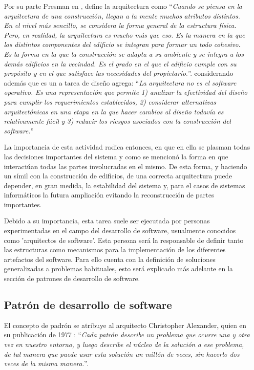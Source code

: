         Por su parte Presman en \cite{Pressman2010}, define la arquitectura como ``\textit{Cuando se piensa en la arquitectura de una construcción, llegan a la mente muchos atributos distintos. En el nivel más sencillo, se considera la forma general de la estructura física. Pero, en realidad, la arquitectura es mucho más que eso. Es la manera en la que los distintos componentes del edificio se integran para formar un todo cohesivo. Es la forma en la que la construcción se adapta a su ambiente y se integra a los demás edificios en la vecindad. Es el grado en el que el edificio cumple con su propósito y en el que satisface las necesidades del propietario.}''. considerando además que es un a tarea de diseño agrega: ``\textit{La arquitectura no es el software operativo. Es una representación que permite 1) analizar la efectividad del diseño para cumplir los requerimientos establecidos, 2) considerar alternativas arquitectónicas en una etapa en la que hacer cambios al diseño todavía es relativamente fácil y 3) reducir los riesgos asociados con la construcción del software.}''

        La importancia de esta actividad radica entonces, en que en ella se plasman todas las decisiones importantes del sistema y como se mencionó la forma en que interactúan todas las partes involucradas en el mismo. De esta forma, y haciendo un símil con la construcción de edificios, de una correcta arquitectura puede depender, en gran medida, la estabilidad del sistema y, para el casos de sistemas informáticos la futura ampliación evitando la reconstrucción de partes importantes.
        
        Debido a su importancia, esta tarea suele ser ejecutada por personas experimentadas en el campo del desarrollo de software, usualmente conocidos como 'arquitectos de software'. Esta persona será la responsable de definir tanto las estructuras como mecanismos para la implementación de los diferentes artefactos del software. Para ello cuenta con la definición de soluciones generalizadas a problemas habituales, esto será explicado más adelante en la sección de patrones de desarrollo de software.
           
    \subsection{Patrón de desarrollo de software}
    \label{sub:FramePattern}
        El concepto de padrón se atribuye al arquitecto Christopher Alexander, quien en su publicación de 1977 \cite{Alexander1977}: ``\textit{Cada patrón describe un problema que ocurre una y otra vez en nuestro entorno, y luego describe el núcleo de la solución a ese problema, de tal manera que puede usar esta solución un millón de veces, sin hacerlo dos veces de la misma manera.}''.
        
